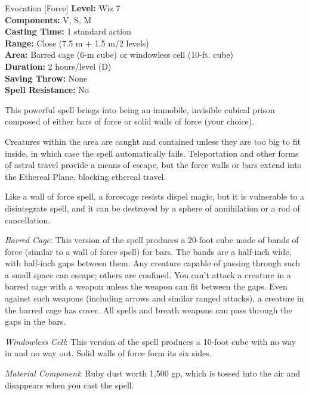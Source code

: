 {Evocation [Force]}
{
	\textbf{Level:}
	Wiz 7\\
	\textbf{Components:}
	V, S, M\\
	\textbf{Casting Time:}
	1 standard action\\
	\textbf{Range:}
	Close (7.5 m + 1.5 m/2 levels)\\
	\textbf{Area:}
	Barred cage (6-m cube) or windowless cell (10-ft. cube)\\
	\textbf{Duration:}
	2 hours/level (D)\\
	\textbf{Saving Throw:}
	None\\
	\textbf{Spell Resistance:}
	No\\
}
{
	This powerful spell brings into being an immobile, invisible cubical prison composed of either bars of force or solid walls of force (your choice).

	Creatures within the area are caught and contained unless they are too big to fit inside, in which case the spell automatically fails. Teleportation and other forms of astral travel provide a means of escape, but the force walls or bars extend into the Ethereal Plane, blocking ethereal travel.

	Like a wall of force spell, a forcecage resists dispel magic, but it is vulnerable to a disintegrate spell, and it can be destroyed by a sphere of annihilation or a rod of cancellation.

	\textit{Barred Cage}:
	This version of the spell produces a 20-foot cube made of bands of force (similar to a wall of force spell) for bars. The bands are a half-inch wide, with half-inch gaps between them. Any creature capable of passing through such a small space can escape; others are confined. You can't attack a creature in a barred cage with a weapon unless the weapon can fit between the gaps. Even against such weapons (including arrows and similar ranged attacks), a creature in the barred cage has cover. All spells and breath weapons can pass through the gaps in the bars.

	\textit{Windowless Cell}:
	This version of the spell produces a 10-foot cube with no way in and no way out. Solid walls of force form its six sides.

	\textit{Material Component}:
	Ruby dust worth 1,500 gp, which is tossed into the air and disappears when you cast the spell.

}
